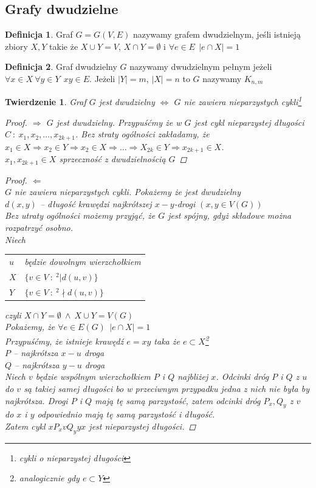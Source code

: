 \documentclass[12pt,a4paper]{article}
\newtheorem{tw}{Twierdzenie}
\theoremstyle{definition}
\newtheorem{df}{Definicja}
\newcommand{\egz}{\marginpar{\color{red} EGZAMIN}} %
\begin{document}
\subsection{Grafy dwudzielne}
\begin{df}
Graf $G=G(V, E)$ nazywamy grafem dwudzielnym, jeśli istnieją zbiory $X, Y$ takie że $X \cup Y = V$, $X \cap Y = \emptyset$ i $\forall e\in E ~~ |e\cap X| = 1$
\end{df}

\begin{df}
Graf dwudzielny $G$ nazywamy dwudzielnym pełnym jeżeli $\forall x\in X ~\forall y\in Y ~~ xy\in E$. Jeżeli $|Y| = m$, $|X| = n$ to $G$ nazywamy $K_{n,m}$
\end{df}

\begin{tw}\egz
Graf $G$ jest dwudzielny $\Leftrightarrow$ $G$ nie zawiera nieparzystych cykli\footnote{cykli o nieparzystej długości}
\begin{proof}$\Rightarrow$
$G$ jest dwudzielny. Przypuśćmy że w $G$ jest cykl nieparzystej długości $C ~:~ x_1,x_2,\dots, x_{2k+1}$. Bez straty ogólności zakładamy, że $x_1 \in X \Rightarrow x_2\in Y \Rightarrow x_2\in X \Rightarrow \dots \Rightarrow X_{2k}\in Y \Rightarrow x_{2k+1}\in X$. \\
$x_1,x_{2k+1}\in X$ sprzeczność z dwudzielnością $G$ 
\end{proof}
\begin{proof}$\Leftarrow$\\
$G$ nie zawiera nieparzystych cykli. Pokażemy że jest dwudzielny\\
$d(x,y)$ -- długość krawędzi najkrótszej $x-y$-drogi $(x,y \in V(G))$\\
Bez utraty ogólności możemy przyjąć, że $G$ jest spójny, gdyż składowe można rozpatrzyć osobno.\\
Niech
\begin{tabular}{l l}
	$u$ & będzie dowolnym wierzchołkiem\\
	$X$ & $\{ v\in V ~:~ ^2|d(u,v)\}$\\
	$Y$ & $\{ v\in V ~:~ ^2\nmid d(u,v)\}$
\end{tabular}
czyli $X\cap Y = \emptyset ~\wedge~ X\cup Y = V(G)$\\
Pokażemy, że $\forall e\in E(G) ~~ |e\cap X| = 1$\\
Przypuśćmy, że istnieje krawędź $e = xy$ taka  że $e\subset X$\footnote{analogicznie gdy $e\subset Y$}\\
$P$ -- najkrótsza $x-u$ droga\\
$Q$ -- najkrótsza $y-u$ droga\\
Niech $v$ będzie wspólnym wierzchołkiem $P$ i $Q$ najbliżej $x$. Odcinki dróg $P$ i $Q$ z $u$ do $v$ są takiej samej długości bo w przeciwnym przypadku jedna z nich nie była by najkrótsza. Drogi $P$ i $Q$ mają tę samą parzystość, zatem odcinki dróg $P_x, Q_y$ z $v$ do $x$ i $y$ odpowiednio mają tę samą parzystość i długość. \\Zatem cykl $xP_xvQ_yyx$ jest nieparzystej długości.
\end{proof}
\end{tw}
\end{document}
